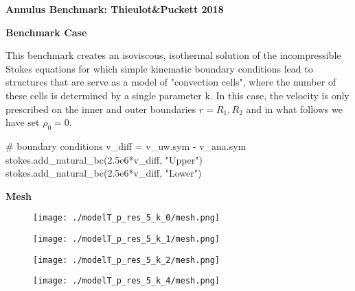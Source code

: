 \documentclass[12pt]{article}
\numberwithin{equation}{subsection}
\begin{document}
 

\cleardoublepage
{}
\recalctypearea
{}

\eject \pdfpagewidth=11.4in \pdfpageheight=10.8in 

\newpage

\vspace{1.5in} 

\begin{adjustwidth}{10cm}{1cm}
	\vspace{5.5in}  
	\textbf{Annulus Benchmark: Thieulot\&Puckett 2018}
\end{adjustwidth}

\newpage

\textbf{Benchmark Case}
\vspace{0.2in}

\begin{adjustwidth}{1cm}{5cm}
	\hspace{0.2in} This benchmark creates an isoviscous, isothermal solution of the incompressible Stokes
	equations for which simple kinematic boundary conditions lead to structures that are 
	serve as a model of "convection cells", where the number of these cells is determined
	by a single parameter k. In this case, the velocity is only prescribed on the inner and 
	outer boundaries  $r = R_{1}, R_{2}$ and in what follows we have set $\rho_{0} = 0$.
\end{adjustwidth}

\vspace{0.2in}

\begin{adjustwidth}{1cm}{5cm}
	\begin{python}
		# boundary conditions
		v_diff =  v_uw.sym - v_ana.sym
		stokes.add_natural_bc(2.5e6*v_diff, "Upper")
		stokes.add_natural_bc(2.5e6*v_diff, "Lower")
	\end{python}
\end{adjustwidth}


\vspace{1.2in}
\textbf{Mesh}
\begin{figure*}[!htb]
	
	\begin{multicols}{4}
		\texttt{[image: ./modelT\_p\_res\_5\_k\_0/mesh.png]}\par
		\hspace{0.75in}
		\texttt{[image: ./modelT\_p\_res\_5\_k\_1/mesh.png]}\par
		\hspace{1.5in}
		\texttt{[image: ./modelT\_p\_res\_5\_k\_2/mesh.png]}\par
		\hspace{2.25in}
		\texttt{[image: ./modelT\_p\_res\_5\_k\_4/mesh.png]}
	\end{multicols}
	
\end{figure*}
\end{document}
